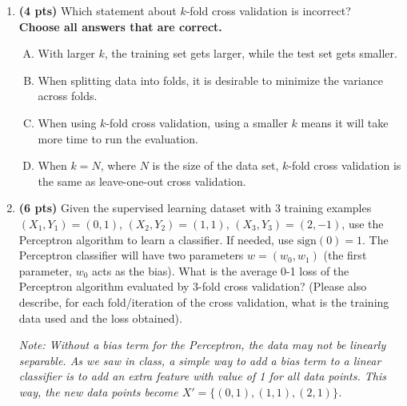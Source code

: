 \documentclass{article}
\begin{document}
\begin{enumerate}[1.]
\begin{tcolorbox}[breakable,
enhanced,
notitle,
width=15.1cm,
height=5cm]
%
%

\end{tcolorbox}

\item \textbf{(4 pts)} Which statement about $k$-fold cross validation is incorrect?\\
{\bf Choose all answers that are correct.}
\begin{enumerate}[(A)]
    \item With larger $k$, the training set gets larger, while the test set gets smaller.
    \item When splitting data into folds, it is desirable to minimize the variance across folds.
    \item When using $k$-fold cross validation, using a smaller $k$ means it will take more time to run the evaluation.
    \item When $k=N$, where $N$ is the size of the data set, $k$-fold cross validation is the same as leave-one-out cross validation.
\end{enumerate}

\begin{tcolorbox}[breakable,
enhanced,
notitle,
width=15.1cm,
height=5cm]
%
%

\end{tcolorbox}

\newpage
\item \textbf{(6 pts)} Given the supervised learning dataset with 3 training examples $(X_1,Y_1) =(0,1)$, $(X_2,Y_2)=(1,1)$, $(X_3,Y_3) = (2,-1)$, use the Perceptron algorithm to learn a classifier. If needed, use $\text{sign}(0)=1$.  The Perceptron classifier will have two parameters $w=(w_0, w_1)$ (the first parameter, $w_0$ acts as the bias).
What is the average 0-1 loss of the Perceptron algorithm evaluated by 3-fold cross validation? (Please also describe, for each fold/iteration of the cross validation, what is the training data used and the loss obtained).

\emph{
Note: Without a bias term for the Perceptron, the data may not be linearly separable. 
As we saw in class, a simple way to add a bias term to a linear classifier is to add an extra feature with value of 1 for all data points.
This way, the new data points become $X'=\{(0, 1), (1, 1), (2, 1)\}$. 
}



\begin{tcolorbox}[breakable,
enhanced,
notitle,
width=15.5cm,
height=18cm]
%
%

\end{tcolorbox}

\end{enumerate}
\end{document}
